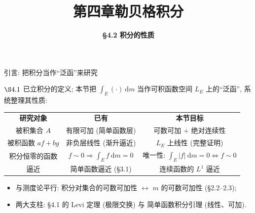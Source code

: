 


\title[第四章\\
勒贝格积分]{\texorpdfstring{\LARGE \bfseries 第四章\quad 勒贝格积分}{第四章 勒贝格积分}} %
\author[\S 4.2\\
积分的性质] %
{\Large \bfseries \S 4.2 积分的性质}
\date{}





\begin{frame}

\titlepage

\end{frame}




\begin{frame}{引言: 把积分当作``泛函''来研究}

$\S 4.1$ 已立积分的定义; 本节把 $\int_E (\cdot) ~ \mathrm{d} m$ 当作可积函数空间 $L_E$ 上的``泛函'',
系统整理其性质:

\begin{center}
\begin{tabular}{ccc}
\textbf{研究对象} & \textbf{已有} & \textbf{本节目标} \\[0.2em]
被积\alert{集合} $A$ & 有限可加 (简单函数层) & 可数可加 + \alert{绝对连续性} \\
被积\alert{函数} $af + bg$ & 非负层线性 (渐升逼近) & $L_E$ 上线性 (完整证明) \\
积分恒零的函数 & $f \sim 0 \Rightarrow \int_E f ~ \mathrm{d} m = 0$ & \alert{唯一性}: $\int_E |f| ~ \mathrm{d} m = 0 \iff f \sim 0$ \\
逼近 & 简单函数逼近 (\S 3.1) & \alert{连续函数}的 $L^1$ 逼近 \\
\end{tabular}
\end{center}

\pause

\begin{itemize}
\item 与测度论平行: 积分对集合的可数可加性 $\leftrightarrow$ $m$ 的可数可加性 (\S 2.2--2.3);
\item 两大支柱: \S 4.1 的 \alert{Levi 定理} (极限交换) 与 \alert{简单函数积分引理} (线性、可加).
\end{itemize}

\end{frame}

